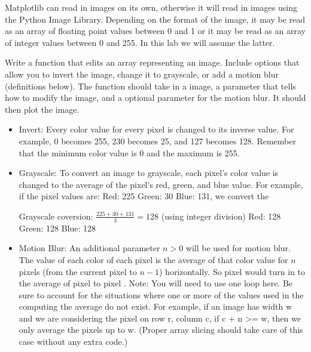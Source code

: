 Matplotlib can read in  images on its own, otherwise it will read in images using the Python Image Library.
Depending on the format of the image, it may be read as an array of floating point values between 0 and 1 or it may be read as an array of integer values between 0 and 255.
In this lab we will assume the latter.

\begin{problem}
Write a function that edits an array representing an image.
Include options that allow you to  invert the image, change it to grayscale, or add a motion blur (definitions below). 
The function should take in a image, a parameter that tells how to modify the image, and a optional parameter for the motion blur.
It should then plot the image. 
\end{problem}

\begin{itemize}
\item Invert:
Every color value for every pixel is changed to its inverse value. For example, 0 becomes 255, 230 becomes 25, and 127 becomes 128.
Remember that the minimum color value is 0 and the maximum is 255.

\item Grayscale:
To convert an image to grayscale, each pixel’s color value is changed to the average of 
the pixel’s red, green, and blue value. For example, if the pixel values are:
Red: 225 Green: 30 Blue: 131, we convert the 

Grayscale coversion: $\frac{225 + 30 + 131}{3} = 128$ (using integer division)
Red: 128 Green: 128 Blue: 128

\item Motion Blur:
An additional parameter $n>0$ will be used for motion blur.
The value of each color of each pixel is the average of that color value for $n$ pixels (from 
the current pixel to $n-1$) horizontally. So pixel \li{[x,y,0]} would turn in to the average of
pixel \li{[ x, y,0 ]} to pixel \li{[ x,y+n-1,0]}.
Note: You will need to use one  loop here.
Be sure to account for the situations where one or more of the values used in the computing the average do not exist. For example, if an image has width w and we are considering the pixel on row r, column c, if c + n >= w, then we only average the pixels up to w. (Proper array slicing should take care of this case without any extra code.)

\end{itemize}


